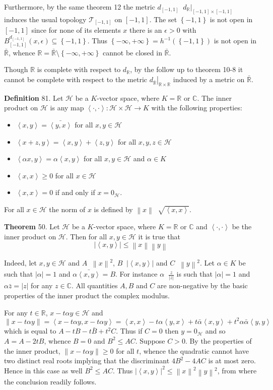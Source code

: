 \documentclass[a4paper]{article}
\newcommand{\obj}[1]{\left\{ #1 \right \}}
\newcommand{\clo}[1]{\left [ #1 \right ]}
\newcommand{\brac}[1]{\left ( #1 \right )}
\newcommand{\induc}[1]{\left . #1 \right \vert}
\newcommand{\abs}[1]{\left | #1 \right |}
\newcommand{\nrm}[1]{\left\| #1 \right \|}
\newcommand{\brkt}[1]{\left\langle #1 \right\rangle}
\newcommand{\Rbar}{{\bar{\mathbb{R}}}}
\newcommand{\Real}{\mathbb{R}}
\newcommand{\Cplx}{\mathbb{C}}
\newcommand{\Tcal}{\mathcal{T}}
\newcommand{\Hcal}{\mathcal{H}}
\newcommand{\defn}{\mathop{\overset{\Delta}{=}}\nolimits}
\begin{document}
Furthermore, by the same theorem 12 the metric $d_{\clo{-1,1}}\defn \induc{d_\Real}_{\clo{-1,1}\times \clo{-1,1}}$ induces the usual topology $\Tcal_{\clo{-1,1}}$ on $\clo{-1,1}$. The set $\obj{-1,1}$ is not open in $\clo{-1,1}$ since for none of its elements $x$ there is an $\epsilon>0$ with $B_{\clo{-1,1}}^{d_{\clo{-1,1}}}\brac{x,\epsilon}\subseteq \obj{-1,1}$. Thus $\obj{-\infty, +\infty} = h^{-1}\brac{\obj{-1,1}}$ is not open in $\Rbar$, whence $\Real = \Rbar\setminus\obj{-\infty, +\infty}$ cannot be closed in $\Rbar$.

Though $\Real$ is complete with respect to $d_\Real$, by the follow up to theorem 10-8 it cannot be complete with respect to the metric $\induc{d_\Rbar}_{\Real\times \Real}$ induced by a metric on $\Rbar$.

\noindent \textbf{Definition} 81.
Let $\Hcal$ be a $K$-vector space, where $K=\Real$ or $\Cplx$. The inner product on $\Hcal$ is any map $\brkt{\cdot,\cdot}:\Hcal\times\Hcal\to K$ with the following properties:\begin{itemize}
	\item $\brkt{x,y} = \bar{ \brkt{y,x} }$ for all $x,y\in \Hcal$
	\item $\brkt{x+z,y} = \brkt{x,y} + \brkt{z,y}$ for all $x,y,z\in \Hcal$
	\item $\brkt{\alpha x,y} = \alpha \brkt{x,y}$ for all $x,y\in \Hcal$ and $\alpha\in K$
	\item $\brkt{x,x}\geq 0$ for all $x\in \Hcal$
	\item $\brkt{x,x}=0$ if and only if $x=0_\Hcal$.
\end{itemize}
For all $x\in \Hcal$ the norm of $x$ is defined by $\nrm{x}\defn \sqrt{\brkt{x,x}}$.

\label{thm:cauchy_schwartz_inner_prod} \noindent \textbf{Theorem} 50.
Let $\Hcal$ be a $K$-vector space, where $K=\Real$ or $\Cplx$ and $\brkt{\cdot,\cdot}$ be the inner product on $\Hcal$. Then for all $x,y\in \Hcal$ it is true that \[\abs{\brkt{x,y}} \leq \nrm{x} \nrm{y}\]

Indeed, let $x,y\in\Hcal$ and $A\defn \nrm{x}^2$, $B\defn \abs{\brkt{x,y}}$ and $C\defn \nrm{y}^2$. Let $\alpha\in K$ be such that $\abs{\alpha}=1$ and $\alpha \bar{\brkt{x,y}} = B$. For instance $\alpha\defn \frac{z}{\abs{z}}$ is such that $\abs{\alpha} = 1$ and $\alpha \bar{z} = \abs{z}$ for any $z\in \Cplx$. All quantities $A,B$ and $C$ are non-negative by the basic properties of the inner product the complex modulus.

For any $t\in \Real$, $x-t\alpha y\in \Hcal$ and \[\nrm{x-t\alpha y} =\brkt{x-t\alpha y, x-t\alpha y} = \brkt{x,x} -t\alpha \brkt{y,x} + t\bar{\alpha}\brkt{x,y} + t^2 \alpha \bar{\alpha} \brkt{y,y}\] which is equal to $A - t B - t\bar{B} + t^2 C$. Thus if $C=0$ then $y=0_\Hcal$ and so $A = A - 2 t B$, whence $B=0$ and $B^2\leq AC$. Suppose $C>0$. By the properties of the inner product, $\nrm{x-t\alpha y}\geq 0$ for all $t$, whence the quadratic cannot have two distinct real roots implying that the discriminant $4B^2-4AC$ is at most zero. Hence in this case as well $B^2\leq AC$. Thus $\abs{\brkt{x,y}}^2 \leq \nrm{x}^2\nrm{y}^2$, from where the conclusion readily follows.\\
\end{document}
